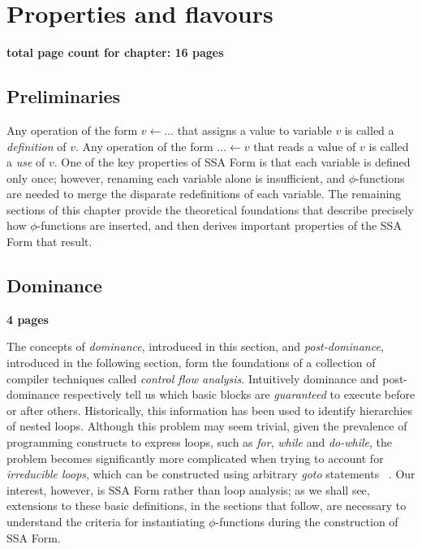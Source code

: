 \chapter{Properties and flavours }
\label{chap:properties-and-flavours}

\textbf{total page count for chapter: 16 pages}

\section{Preliminaries}

Any operation of the form $v \leftarrow \ldots$ that assigns a value
to variable $v$ is called a \emph{definition} of $v$. Any operation
of the form $\ldots \leftarrow v$ that reads a value of $v$ is called
a \emph{use} of $v$. One of the key properties of SSA Form is that
each variable is defined only once; however, renaming each variable 
alone is insufficient, and $\phi$-functions are needed to merge
the disparate redefinitions of each variable. The remaining 
sections of this chapter provide the theoretical foundations that
describe precisely how $\phi$-functions are inserted, and then
derives important properties of the SSA Form that result. 

\section{Dominance}

\textbf{4 pages}

The concepts of \emph{dominance}, introduced in this section, and 
\emph{post-dominance}, introduced in the following section, form the
foundations of a collection of compiler techniques called 
\emph{control flow analysis}. Intuitively dominance and post-dominance
respectively tell us which basic blocks are \emph{guaranteed} to
execute before or after others. Historically, this information has
been used to identify hierarchies of nested loops. Although this
problem may seem trivial, given the prevalence of programming 
constructs to express loops, such as \emph{for}, \emph{while} and
\emph{do-while}, the problem becomes significantly more complicated
when trying to account for \emph{irreducible loops}, which can be
constructed using arbitrary \emph{goto} statements
~\cite{RamlingamSep02}. Our interest, however, is SSA Form
rather than loop analysis; as we shall see, extensions to these
basic definitions, in the sections that follow, are necessary to
understand the criteria for instantiating $\phi$-functions 
during the construction of SSA Form. 

